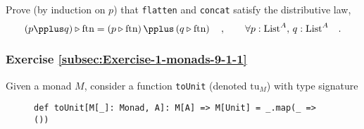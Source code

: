 Prove (by induction on $p$) that \lstinline!flatten! and \lstinline!concat!
satisfy the distributive law,
\[
\left(p\pplus q\right)\triangleright\text{ftn}=\left(p\triangleright\text{ftn}\right)\pplus\left(q\triangleright\text{ftn}\right)\quad,\quad\quad\forall p:\text{List}^{A},\,q:\text{List}^{A}\quad.
\]
\begin{comment}

\subparagraph{Solution}

The values $p$ and $q$ must have type $\text{List}^{\text{List}^{A}}$.
There are two possibilities: $p$ is an empty list ($p=1+\bbnum 0$),
and $p=\bbnum 0+h\times t$. If $p$ is empty, so is $p\triangleright\text{ftn}$
and the law holds. In the other case, we have (due to the code of
$\pplus$) that
\[
\left(\bbnum 0+h\times t\right)\pplus q=\bbnum 0+h\times\left(t\pplus q\right)\quad,
\]
and so
\begin{align*}
 & \left(p\pplus q\right)\triangleright\text{ftn}=\left(\bbnum 0+h\times\left(t\pplus q\right)\right)\triangleright\text{ftn}=h\pplus\gunderline{\left(t\pplus q\right)\triangleright\overline{\text{ftn}}}\\
{\color{greenunder}\text{inductive assumption}:}\quad & =\gunderline{h\pplus\left(t\triangleright\overline{\text{ftn}}\right)}\pplus\left(q\triangleright\overline{\text{ftn}}\right)\\
{\color{greenunder}\text{code of }\text{ftn}:}\quad & =\left(\bbnum 0+h\times t\right)\triangleright\overline{\text{ftn}}\pplus\left(q\triangleright\overline{\text{ftn}}\right)=\left(p\triangleright\text{ftn}\right)\pplus\left(q\triangleright\text{ftn}\right)\quad.
\end{align*}
\end{comment}


\subsubsection{Exercise \label{subsec:Exercise-1-monads-9-1-1}\ref{subsec:Exercise-1-monads-9-1-1}}

Given a monad $M$, consider a function \lstinline!toUnit! (denoted
$\text{tu}_{M}$) with type signature

\begin{wrapfigure}{l}{0.61\columnwidth}%
\vspace{-0.5\baselineskip}
\begin{lstlisting}
def toUnit[M[_]: Monad, A]: M[A] => M[Unit] = _.map(_ => ())
\end{lstlisting}

\vspace{-0.5\baselineskip}
\end{wrapfigure}%


